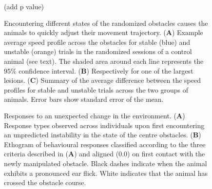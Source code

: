 \begin{figure}
\centering

\caption{Encountering different states of the randomized obstacles causes the animals to quickly adjust their movement trajectory. (\textbf{A}) Example average speed profile across the obstacles for stable (blue) and unstable (orange) trials in the randomized sessions of a control animal (see text). The shaded area around each line represents the 95\% confidence interval. (\textbf{B}) Respectively for one of the largest lesions. (\textbf{C}) Summary of the average difference between the speed profiles for stable and unstable trials across the two groups of animals. Error bars show standard error of the mean.} (add p value)
\label{fig:speed}
\end{figure}

\begin{figure}
\centering

\caption{Responses to an unexpected change in the environment. (\textbf{A}) Response types observed across individuals upon first encountering an unpredicted instability in the state of the centre obstacles. (\textbf{B}) Ethogram of behavioural responses classified according to the three criteria described in (\textbf{A}) and aligned (0.0) on first contact with the newly manipulated obstacle. Black dashes indicate when the animal exhibits a pronounced ear flick. White indicates that the animal has crossed the obstacle course.}
\label{fig:ethogram}
\end{figure}
